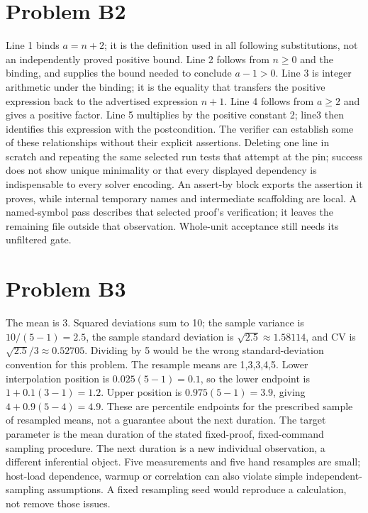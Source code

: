 \documentclass[11pt]{article}
\begin{document}
\section*{Problem B2}\label{ans:B2}
\begin{answer}
Line 1 binds $a=n+2$; it is the definition used in all following substitutions,
not an independently proved positive bound. Line 2 follows from $n\geq0$ and
the binding, and supplies the bound needed to conclude $a-1>0$. Line 3 is
integer arithmetic under the binding; it is the equality that transfers the
positive expression back to the advertised expression $n+1$. Line 4 follows
from $a\geq2$ and gives a positive factor. Line 5 multiplies by the positive
constant 2; line3 then identifies this expression with the postcondition.
The verifier can establish some of these relationships without their explicit
assertions. Deleting one line in scratch and repeating the same selected run
tests that attempt at the pin; success does not show unique minimality or that
every displayed dependency is indispensable to every solver encoding.
An assert-by block exports the assertion it proves, while internal temporary
names and intermediate scaffolding are local. A named-symbol pass describes
that selected proof's verification; it leaves the remaining file outside
that observation. Whole-unit acceptance still needs its unfiltered gate.
\end{answer}
\section*{Problem B3}\label{ans:B3}
\begin{answer}
The mean is 3. Squared deviations sum to 10; the sample variance is
$10/(5-1)=2.5$, the sample standard deviation is $\sqrt{2.5}\approx1.58114$,
and CV is $\sqrt{2.5}/3\approx0.52705$. Dividing by 5 would be the wrong
standard-deviation convention for this problem.
The resample means are 1,3,3,4,5. Lower interpolation position is
$0.025(5-1)=0.1$, so the lower endpoint is $1+0.1(3-1)=1.2$.
Upper position is $0.975(5-1)=3.9$, giving $4+0.9(5-4)=4.9$.
These are percentile endpoints for the prescribed sample of resampled means,
not a guarantee about the next duration. The target parameter is the mean
duration of the stated fixed-proof, fixed-command sampling procedure. The
next duration is a new individual observation, a different inferential object.
Five measurements and five hand resamples are small; host-load dependence,
warmup or correlation can also violate simple independent-sampling assumptions.
A fixed resampling seed would reproduce a calculation, not remove those issues.
\end{answer}
\end{document}
